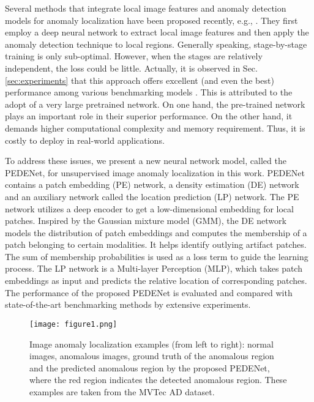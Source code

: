 \documentclass{article}
\begin{document}
Several methods that integrate local image features and anomaly
detection models for anomaly localization have been proposed recently,
e.g., \cite{rippel2020modeling, cohen2020sub,zhang2021anomalyhop}.  They first employ a
deep neural network to extract local image features and then apply the
anomaly detection technique to local regions. 
Generally speaking, stage-by-stage training is only sub-optimal.
However, when the stages are relatively independent, the loss could be
little. Actually, it is observed in Sec. \ref{sec:experiments} that this
approach offers excellent (and even the best) performance among various
benchmarking models \cite{rippel2020modeling,cohen2020sub}. This is
attributed to the adopt of a very large pretrained network.  On one
hand, the pre-trained network plays an important role in their superior
performance. On the other hand, it demands higher computational
complexity and memory requirement.  Thus, it is costly to deploy in
real-world applications.

To address these issues, we present a new neural network model, called
the PEDENet, for unsupervised image anomaly localization in this work.
PEDENet contains a patch embedding (PE) network, a density estimation
(DE) network and an auxiliary network called the location prediction
(LP) network.  The PE network utilizes a deep encoder to get a
low-dimensional embedding for local patches. 
Inspired by the Gaussian mixture model (GMM), the DE network models the
distribution of patch embeddings and computes the membership of a patch
belonging to certain modalities. It helps identify outlying artifact
patches. The sum of membership probabilities is used as a loss term to
guide the learning process.  The LP network is a Multi-layer Perception
(MLP), which takes patch embeddings as input and predicts the relative
location of corresponding patches. The performance of the proposed
PEDENet is evaluated and compared with state-of-the-art benchmarking
methods by extensive experiments. 

\begin{figure}[!t]
\texttt{[image: figure1.png]}
\caption{Image anomaly localization examples (from left to right):
normal images, anomalous images, ground truth of the anomalous region
and the predicted anomalous region by the proposed PEDENet, where the
red region indicates the detected anomalous region. These examples are
taken from the MVTec AD dataset.}\label{fig:1}
\end{figure}
\end{document}
